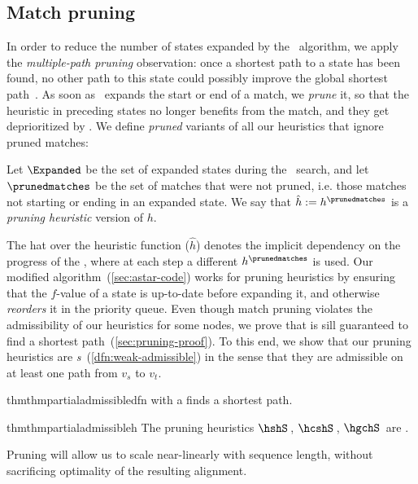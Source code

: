 \subsection{Match pruning} \label{sec:pruning}

In order to reduce the number of states expanded by the \A~algorithm, we apply
the \emph{multiple-path pruning} observation: once a shortest path to a state
has been found, no other path to this state could possibly improve the global
shortest path~\citep{poole2017artificial}. As soon as \A~expands the start or
end of a match, we \emph{prune} it, so that the heuristic in preceding states no
longer benefits from the match, and they get deprioritized by \A. We define
\emph{pruned} variants of all our heuristics that ignore pruned matches:

\begin{definition}
   Let $\Expanded$ be the set of expanded states during the \A~search, and let
   $\prunedmatches$ be the set of matches that were not pruned, i.e. those
   matches not starting or ending in an expanded state. We say that $\hat h :=
   h^\prunedmatches$ is a \emph{pruning heuristic} version of $h$.
\end{definition}

The hat over the heuristic function ($\hat h$) denotes the implicit dependency
on the progress of the \A, where at each step a different $h^\prunedmatches$ is
used. Our modified \A algorithm~(\cref{sec:astar-code})
works for pruning heuristics by ensuring that the $f$-value of a state is
up-to-date before expanding it, and otherwise \emph{reorders} it in the priority
queue. Even though match pruning violates the admissibility of our heuristics
for some nodes, we prove that \A is sill guaranteed to find a shortest
path~(\cref{sec:pruning-proof}). To this end, we show that our pruning
heuristics are \emph{\wah{}s}~(\cref{dfn:weak-admissible}) in the sense that
they are admissible on at least one path from $v_s$ to $v_t$.

\begin{restatable}{thm}{thmpartialadmissibledfn}\label{thm:weak-admissible-dfn}
  \A with a \wah finds a shortest path.
\end{restatable}

\begin{restatable}{thm}{thmpartialadmissibleh}\label{thm:weak-admissible-h}
  The pruning heuristics $\hshS$\,, $\hcshS$\,, $\hgchS$\, are \wa.
\end{restatable}

Pruning will allow us to scale
near-linearly with sequence length, without sacrificing optimality of the
resulting alignment.
